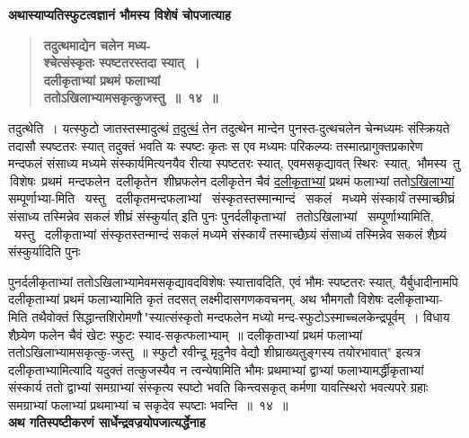 \documentclass[11pt, openany]{book}
\begin{document}
{\small \textbf{अथास्याप्यतिस्फुटत्वज्ञानं भौमस्य विशेषं चोपजात्याह\textendash }}

 \label{2.14}
\begin{quote}
{\large \textbf{{\color{purple}तदुत्थमाद्येन चलेन मध्य-\\
श्चेत्संस्कृतः स्पष्टतरस्तदा स्यात्~। \\
दलीकृताभ्यां प्रथमं फलाभ्यां\\
ततोऽखिलाभ्यामसकृत्कुजस्तु~॥~१४~॥}}}
\end{quote}

तदुत्थेति~। यत्स्फुटो जातस्तस्मादुत्थं \hyperref[2.14]{तदुत्थं} तेन तदुत्थेन मान्देन पुनस्त-दुत्थचलेन चेन्मध्यमः संस्क्रियते तदासौ स्पष्टतरः स्यात् तदुक्तं भवति यः स्पष्टः \;कृतः \;स \;एव \;मध्यमः \;परिकल्प्यः \;तस्मात्प्रागुक्तप्रकारेण \;मन्दफलं संसाध्य मध्यमे संस्कार्यमित्यनयैव रीत्या स्पष्टतरः स्यात्, एवमसकृद्यावत् स्थिरः \,स्यात्, \,भौमस्य \,तु \,विशेषः \,प्रथमं \,मन्दफलेन \,दलीकृतेन \,शीघ्रफलेन दलीकृतेन चैवं \hyperref[2.14]{दलीकृताभ्यां} प्रथमं फलाभ्यां ततो\hyperref[2.14]{ऽखिलाभ्यां} सम्पूर्णाभ्या-मिति ~यस्तु ~दलीकृतमन्दफलाभ्यां ~संस्कृतस्तस्मान्मान्दं ~सकलं ~मध्यमे संस्कार्यं तस्माच्छीघ्रं संसाध्य तस्मिन्नेव सकलं शीघ्रं संस्कुर्यात् इति पुनः पुनर्दलीकृताभ्यां ~ततोऽखिलाभ्यां ~सम्पूर्णाभ्यामिति, ~यस्तु ~दलीकृताभ्यां संस्कृतस्तन्मान्दं \;सकलं \;मध्यमे \;संस्कार्यं \;तस्माच्छैघ्र्यं \;संसाध्यं \;तस्मिन्नेव सकलं शैघ्र्यं संस्कुर्यादिति पुनः

\newpage

\noindent पुनर्दलीकृताभ्यां ततोऽखिलाभ्यामेवमसकृद्यावदविशेषः स्यात्तावदिति, एवं भौमः स्पष्टतरः स्यात्, यैर्बुधादीनामपि दलीकृताभ्यां प्रथमं फलाभ्यामिति कृतं तदसत् लक्ष्मीदासगणकवचनम्, अथ भौमगतौ विशेषः दलीकृताभ्या-मिति तथैवोक्तं {\color{violet}सिद्धान्तशिरोमणौ\textendash \,"स्यात्संस्कृतो मन्दफलेन मध्यो मन्द-स्फुटोऽस्माच्चलकेन्द्रपूर्वम्~। विधाय शैघ्र्येण फलेन चैवं खेटः स्फुटः स्याद-सकृत्फलाभ्याम्~॥ दलीकृताभ्यां प्रथमं फलाभ्यां ततोऽखिलाभ्यामसकृत्कु-जस्तु~॥ स्फुटौ रवीन्दू मृदुनैव वेद्यौ शीघ्राख्यतुङ्गस्य तयोरभावात्"} इत्यत्र दलीकृताभ्यामित्यादि यदुक्तं तत्कुजस्यैव न त्वन्येषामिति भौमः प्रथमाभ्यां द्वाभ्यां \;फलाभ्यामर्द्धीकृताभ्यां \;संस्कार्य \;ततो \;द्वाभ्यां \;समग्राभ्यां \;संस्कृत्य स्पष्टो भवति किन्त्वसकृत् कर्मणा यावत्स्थिरो भवत्यपरे ग्रहाः समग्राभ्यां फलाभ्यां प्रथमाभ्यां च सकृदेव स्पष्टाः भवन्ति~॥~१४~॥\\

{\small \textbf{अथ गतिस्पष्टीकरणं सार्धेन्द्रवज्रयोपजात्यर्द्धेनाह\textendash }}
\end{document}
